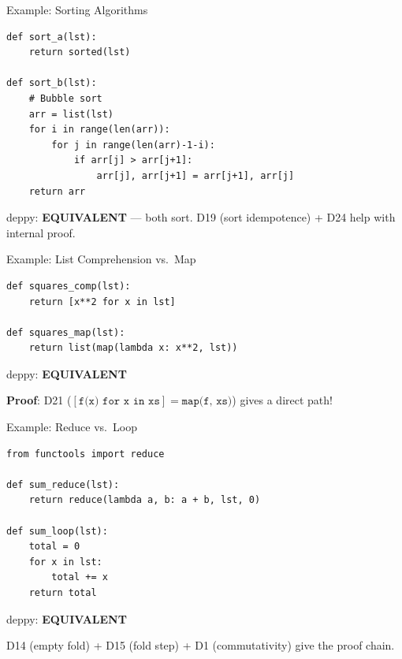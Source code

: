 \documentclass[aspectratio=169,11pt]{beamer}
\begin{document}
\begin{frame}{Example: Sorting Algorithms}
\begin{lstlisting}[language=deppy, basicstyle=\small\ttfamily]
def sort_a(lst):
    return sorted(lst)

def sort_b(lst):
    # Bubble sort
    arr = list(lst)
    for i in range(len(arr)):
        for j in range(len(arr)-1-i):
            if arr[j] > arr[j+1]:
                arr[j], arr[j+1] = arr[j+1], arr[j]
    return arr
\end{lstlisting}

\vspace{0.3em}
deppy: \textbf{EQUIVALENT} --- both sort. D19 (sort idempotence) + D24 help with internal proof.
\end{frame}

\begin{frame}{Example: List Comprehension vs.\ Map}
\begin{lstlisting}[language=deppy, basicstyle=\small\ttfamily]
def squares_comp(lst):
    return [x**2 for x in lst]

def squares_map(lst):
    return list(map(lambda x: x**2, lst))
\end{lstlisting}

\vspace{0.5em}
deppy: \textbf{EQUIVALENT}

\vspace{0.3em}
\textbf{Proof}: D21 ($[\texttt{f(x) for x in xs}] = \texttt{map(f, xs)}$) gives a direct path!
\end{frame}

\begin{frame}{Example: Reduce vs.\ Loop}
\begin{lstlisting}[language=deppy, basicstyle=\small\ttfamily]
from functools import reduce

def sum_reduce(lst):
    return reduce(lambda a, b: a + b, lst, 0)

def sum_loop(lst):
    total = 0
    for x in lst:
        total += x
    return total
\end{lstlisting}

\vspace{0.3em}
deppy: \textbf{EQUIVALENT}

D14 (empty fold) + D15 (fold step) + D1 (commutativity) give the proof chain.
\end{frame}
\end{document}
